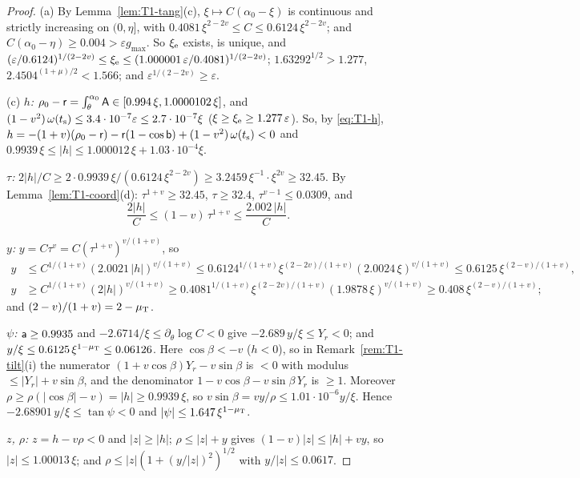 \begin{proof}
(a) By Lemma~\ref{lem:T1-tang}(c), $\xi\mapsto C(\alpha_0-\xi)$ is continuous and strictly increasing on $(0,\eta]$, with
$0.4081\,\xi^{2-2v}\le C\le0.6124\,\xi^{2-2v}$; and $C(\alpha_0-\eta)\ge0.004>\varepsilon g_{\max}$. So $\xi_{\mathrm e}$ exists, is unique, and
$(\varepsilon/0.6124)^{1/(2-2v)}\le\xi_{\mathrm e}\le(1.000001\,\varepsilon/0.4081)^{1/(2-2v)}$; $1.63292^{1/2}>1.277$,
$2.4504^{(1+\mu)/2}<1.566$; and $\varepsilon^{1/(2-2v)}\ge\varepsilon$.

(c) \emph{$h$:} $\rho_0-\mathsf r=\int_\theta^{\alpha_0}\mathsf A\in[0.994\,\xi,1.0000102\,\xi]$, and
$(1-v^2)\,\omega(t_{\mathrm s})\le3.4\cdot10^{-7}\varepsilon\le2.7\cdot10^{-7}\xi$ ($\xi\ge\xi_{\mathrm e}\ge1.277\,\varepsilon$). So, by \eqref{eq:T1-h},
$h=-(1+v)(\rho_0-\mathsf r)-\mathsf r(1-\cos\mathsf b)+(1-v^2)\,\omega(t_{\mathrm s})<0$ and
$0.9939\,\xi\le|h|\le1.000012\,\xi+1.03\cdot10^{-4}\xi$.

\emph{$\tau$:} $2|h|/C\ge2\cdot0.9939\,\xi/(0.6124\,\xi^{2-2v})\ge3.2459\,\xi^{-1}\cdot\xi^{2v}\ge32.45$. By Lemma~\ref{lem:T1-coord}(d):
$\tau^{1+v}\ge32.45$, $\tau\ge32.4$, $\tau^{v-1}\le0.0309$, and
\begin{equation}\label{eq:T1-tau2}
\frac{2|h|}C\le(1-v)\,\tau^{1+v}\le\frac{2.002\,|h|}C .
\end{equation}

\emph{$y$:} $y=C\tau^v=C(\tau^{1+v})^{v/(1+v)}$, so
\begin{align*}
y&\le C^{1/(1+v)}(2.0021\,|h|)^{v/(1+v)}\le0.6124^{1/(1+v)}\xi^{(2-2v)/(1+v)}(2.0024\,\xi)^{v/(1+v)}\le0.6125\,\xi^{(2-v)/(1+v)},\\
y&\ge C^{1/(1+v)}(2|h|)^{v/(1+v)}\ge0.4081^{1/(1+v)}\xi^{(2-2v)/(1+v)}(1.9878\,\xi)^{v/(1+v)}\ge0.408\,\xi^{(2-v)/(1+v)};
\end{align*}
and $(2-v)/(1+v)=2-\mu_{\mathrm T}$.

\emph{$\psi$:} $\mathsf a\ge0.9935$ and $-2.6714/\xi\le\partial_\theta\log C<0$ give $-2.689\,y/\xi\le Y_r<0$; and
$y/\xi\le0.6125\,\xi^{1-\mu_{\mathrm T}}\le0.06126$. Here $\cos\beta<-v$ ($h<0$), so in Remark~\ref{rem:T1-tilt}(i) the numerator
$(1+v\cos\beta)Y_r-v\sin\beta$ is $<0$ with modulus $\le|Y_r|+v\sin\beta$, and the denominator
$1-v\cos\beta-v\sin\beta\,Y_r$ is $\ge1$. Moreover $\rho\ge\rho(|\cos\beta|-v)=|h|\ge0.9939\,\xi$, so
$v\sin\beta=vy/\rho\le1.01\cdot10^{-6}y/\xi$. Hence $-2.68901\,y/\xi\le\tan\psi<0$ and $|\psi|\le1.647\,\xi^{1-\mu_{\mathrm T}}$.

\emph{$z$, $\rho$:} $z=h-v\rho<0$ and $|z|\ge|h|$; $\rho\le|z|+y$ gives $(1-v)|z|\le|h|+vy$, so $|z|\le1.00013\,\xi$; and
$\rho\le|z|(1+(y/|z|)^2)^{1/2}$ with $y/|z|\le0.0617$.


\end{proof}
